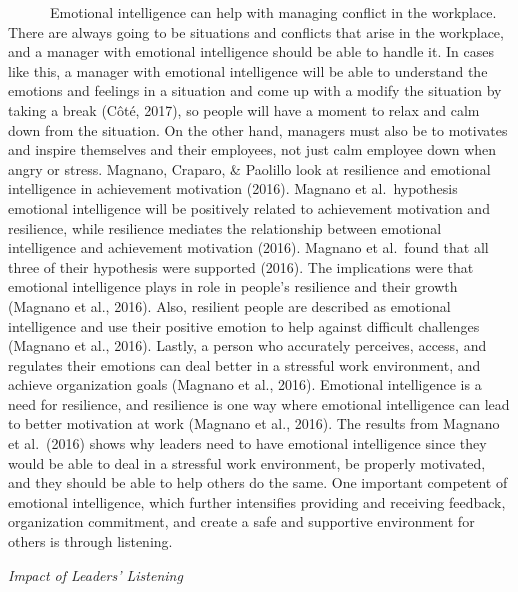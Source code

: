 \documentclass[
  12pt,
]{article}
\begin{document}
~~~~~~Emotional intelligence can help with managing conflict in the workplace. There are always going to be situations and conflicts that arise in the workplace, and a manager with emotional intelligence should be able to handle it. In cases like this, a manager with emotional intelligence will be able to understand the emotions and feelings in a situation and come up with a modify the situation by taking a break (Côté, 2017), so people will have a moment to relax and calm down from the situation. On the other hand, managers must also be to motivates and inspire themselves and their employees, not just calm employee down when angry or stress. Magnano, Craparo, \& Paolillo look at resilience and emotional intelligence in achievement motivation (2016). Magnano et al.~hypothesis emotional intelligence will be positively related to achievement motivation and resilience, while resilience mediates the relationship between emotional intelligence and achievement motivation (2016). Magnano et al.~found that all three of their hypothesis were supported (2016). The implications were that emotional intelligence plays in role in people's resilience and their growth (Magnano et al., 2016). Also, resilient people are described as emotional intelligence and use their positive emotion to help against difficult challenges (Magnano et al., 2016). Lastly, a person who accurately perceives, access, and regulates their emotions can deal better in a stressful work environment, and achieve organization goals (Magnano et al., 2016). Emotional intelligence is a need for resilience, and resilience is one way where emotional intelligence can lead to better motivation at work (Magnano et al., 2016). The results from Magnano et al.~(2016) shows why leaders need to have emotional intelligence since they would be able to deal in a stressful work environment, be properly motivated, and they should be able to help others do the same. One important competent of emotional intelligence, which further intensifies providing and receiving feedback, organization commitment, and create a safe and supportive environment for others is through listening.

\emph{Impact of Leaders' Listening}
\end{document}
